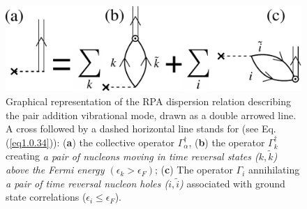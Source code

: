 \begin{figure}
	\centerline {
		\includegraphics*[width=12cm]{introduccion/figs/fig_preface_3_1}
	}
	\caption{Graphical representation of the RPA dispersion relation describing the pair addition  vibrational mode, drawn as a double arrowed line.  A cross followed by a dashed horizontal line stands for (see Eq. (\ref{eq1.0.34})): (\textbf{a}) the collective operator $\Gamma_\alpha^\dagger$, (\textbf{b}) the operator $\Gamma_k^\dagger$ creating \textit{a pair of nucleons moving in time reversal  states ($k,\tilde k$) above the Fermi energy $(\epsilon_k>\epsilon_F)$}; (\textbf{c}) The operator $\Gamma_i$ annihilating \textit{a pair of time reversal nucleon holes  ($i,\tilde i$)} associated with ground state correlations ($\epsilon_i\leq\epsilon_F$).}
	\label{fig0.3.1}
\end{figure}
